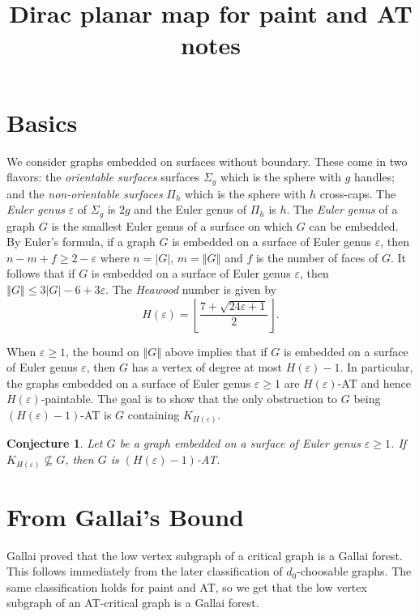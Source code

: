 \documentclass[12pt]{article}
\theoremstyle{plain}
\newtheorem{conjecture}[thm]{Conjecture}
\theoremstyle{definition}
\theoremstyle{remark}
\newcommand{\card}[1]{\left|#1\right|}
\newcommand{\size}[1]{\left\Vert#1\right\Vert}
\newcommand{\floor}[1]{\left\lfloor#1\right\rfloor}
\begin{document}
\title{Dirac planar map for paint and AT notes}
\author{}
\maketitle

\section{Basics}
We consider graphs embedded on surfaces without boundary.  These come in two flavors: the \emph{orientable surfaces} surfaces $\Sigma_g$ which is the sphere with $g$ handles; and the \emph{non-orientable surfaces}  $\Pi_h$ which is the sphere with $h$ cross-caps.  The \emph{Euler genus} $\varepsilon$ of $\Sigma_g$ is $2g$ and the Euler genus of $\Pi_h$ is $h$.  The \emph{Euler genus} of a graph $G$ is the smallest Euler genus of a surface on which $G$ can be embedded.  By Euler's formula, if a graph $G$ is embedded on a surface of Euler genus $\varepsilon$, then $n-m+f \ge 2 - \varepsilon$ where $n = \card{G}$, $m = \size{G}$ and $f$ is the number of faces of $G$.  It follows that if $G$ is embedded on a surface of Euler genus $\varepsilon$, then $\size{G} \le 3\card{G} - 6 + 3\varepsilon$. The \emph{Heawood} number is given by
\[H(\varepsilon) = \floor{\frac{7 + \sqrt{24\varepsilon + 1}}{2}}.\]

When $\varepsilon \ge 1$, the bound on $\size{G}$ above implies that if $G$ is embedded on a surface of Euler genus $\varepsilon$, then $G$ has a vertex of degree at most $H(\varepsilon) - 1$.  In particular, the graphs embedded on a surface of Euler genus $\varepsilon \ge 1$ are $H(\varepsilon)$-AT and hence $H(\varepsilon)$-paintable.  The goal is to show that the only obstruction to $G$ being  $(H(\varepsilon) - 1)$-AT is $G$ containing $K_{H(\varepsilon)}$.

\begin{conjecture}\label{MainC}
	Let $G$ be a graph embedded on a surface of Euler genus $\varepsilon \ge 1$.  If $K_{H(\varepsilon)} \not \subseteq G$, then $G$ is $(H(\varepsilon) - 1)$-AT.
\end{conjecture}

\section{From Gallai's Bound}
Gallai proved that the low vertex subgraph of a critical graph is a Gallai forest.  This follows immediately from the later classification of $d_0$-choosable graphs.  The same classification holds for paint and AT, so we get that the low vertex
subgraph of an AT-critical graph is a Gallai forest.
\end{document}
